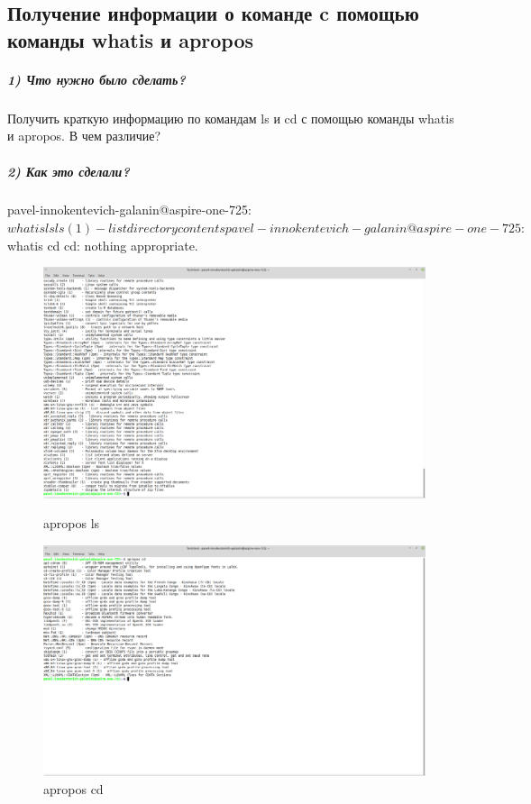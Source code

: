 \subsection{Получение информации о команде c помощью команды whatis и apropos}

\subparagraph{1) Что нужно было сделать?}

Получить краткую информацию по командам ls и cd с помощью команды whatis и apropos. В чем различие?

\subparagraph{2) Как это сделали?}

\begin{MyVerbatimCode}[label=Debian terminal]
pavel-innokentevich-galanin@aspire-one-725:~$ whatis ls
ls (1)               - list directory contents
pavel-innokentevich-galanin@aspire-one-725:~$ whatis cd
cd: nothing appropriate.
\end{MyVerbatimCode}

\begin{figure}[!htp]
    \begin{minipage}{0.49\textwidth}
        \centering
        \includegraphics[width=\linewidth]
            {input/task-1/6/apropos-ls.png}
        \caption{apropos ls}
        \label{fig:apropos-ls}
    \end{minipage}
    \begin{minipage}{0.49\textwidth}
        \centering
        \includegraphics[width=\linewidth]
            {input/task-1/6/apropos-cd.png}
        \caption{apropos cd}
        \label{fig:apropos-cd}
    \end{minipage}
\end{figure}

